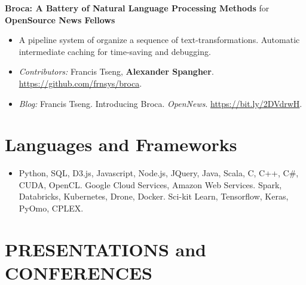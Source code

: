 \documentclass[margin]{res}
\newcommand{\fullhrulefill}{%
	\vspace{.7\baselineskip}
	\hspace*{-\sectionwidth}\hrulefill%
}
\begin{document}
\begin{resume}
\textbf{Broca: A Battery of Natural Language Processing Methods} for \textbf{OpenSource News Fellows}
\begin{itemize}
	\item A pipeline system of organize a sequence of text-transformations. Automatic intermediate caching for time-saving and debugging.
	\item \textit{Contributors:} Francis Tseng, \textbf{Alexander Spangher}. \url{https://github.com/frnsys/broca}. 
	\item \textit{Blog:} Francis Tseng. Introducing Broca. \textit{OpenNews}. \url{https://bit.ly/2DVdrwH}.

\end{itemize}

\section{Languages and Frameworks} 
\begin{itemize}
	\item[] Python, SQL, D3.js, Javascript, Node.js, JQuery, Java, Scala, C, C++, C\#, CUDA, OpenCL. Google Cloud Services, Amazon Web Services. Spark, Databricks, Kubernetes, Drone, Docker. Sci-kit Learn, Tensorflow, Keras, PyOmo, CPLEX.
\end{itemize}

\vspace{2\baselineskip}
\section{PRESENTATIONS and CONFERENCES}
\vspace{2\baselineskip}
\fullhrulefill

\end{resume}
\end{document}
